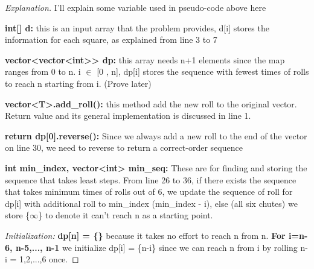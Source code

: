 \documentclass[openany]{article}
\begin{document}
\begin{proof}[Explanation]{}
		\renewcommand{\qedsymbol}{} %
        I'll explain some variable used in pseudo-code above here

        \textbf{int[] d:} this is an input array that the problem provides, d[i] stores the information for each square, as explained from line 3 to 7
        
        \textbf{vector<vector<int>> dp:} this array needs n+1 elements since the map ranges from 0 to n. i $\in$ [0 , n], dp[i] stores the sequence with fewest times of rolls to reach n starting from i. (Prove later)
        
        \textbf{vector<T>.add\_roll():} this method add the new roll to the original vector. Return value and its general implementation is discussed in line 1.
        
        \textbf{return dp[0].reverse():} Since we always add a new roll to the end of the vector on line 30, we need to reverse to return a correct-order sequence
        
        \textbf{int min\_index, vector<int> min\_seq:} These are for finding and storing the sequence that takes least steps. From line 26 to 36, if there exists the sequence that takes minimum times of rolls out of 6, we update the sequence of roll for dp[i] with additional roll to min\_index (min\_index - i), else (all six chutes) we store \{$\infty$\} to denote it can't reach n as a starting point.
        
        \textit{Initialization:} \textbf{dp[n] = \{\}} because it takes no effort to reach n from n. \textbf{For i=n-6, n-5,..., n-1} we initialize dp[i] = \{n-i\} since we can reach n from i by rolling n-i = 1,2,...,6 once.

       
\end{proof}
\end{document}
